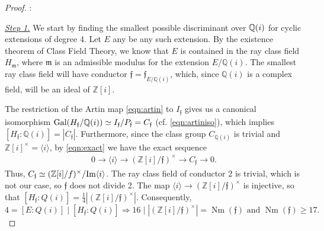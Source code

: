 \documentclass[smallextended]{svjour3}
\newcommand{\Q}{\mathbb{Q}}
\newcommand{\Z}{\mathbb{Z}}
\newcommand{\G}{{\rm Gal}}
\DeclareMathOperator{\Nm}{Nm}
\begin{document}
\begin{proof}:

\noindent\emph{\underline{Step 1.}}   
We start by finding the smallest possible discriminant over $\Q(i)\\
$ for cyclic extensions of degree 4. Let $E$ any be any such extension. By the existence theorem of Class Field Theory, we know that $E$ is contained in the ray class field $ H_{\mathfrak m}$, where $\mathfrak m$ is an admissible modulus for the extension $E/\Q(i)$. The smallest ray class field will have conductor $\mathfrak f = \mathfrak f_{E/\Q(i)}$, which, since $\Q(i)$ is a complex field, will be an ideal of $\Z[i]$. 

The restriction of the Artin map \eqref{eqn:artin} to $I_{\mathfrak f}$ gives us a canonical isomorphism $\G(H_{\mathfrak f}/\Q(i)) \simeq I_{\mathfrak f}/P_{\mathfrak f} = C_{\mathfrak f}$ (cf. \eqref{eqn:artiniso}), which implies $[H_{\mathfrak f}:\Q(i)] = |C_{\mathfrak f}|$. Furthermore, since the class group $C_{\Q(i)}$ is trivial and $\Z[i]^{\times}=\langle i \rangle$, by \eqref{eqn:exact} we have the exact sequence
\begin{align*}
0\to \langle i \rangle \to (\Z[i]/{\mathfrak f})^{\times} \to  C_{\mathfrak f} \to 0.
\end{align*}
Thus, $C_{\mathfrak f} \simeq (\Z[i]/f)^{\times}/ \hbox{Im} \langle i \rangle$.
The ray class field of conductor 2 is trivial, which is not our case, so  $\mathfrak f$ does not divide 2. The map $\langle i \rangle \to(\Z[i]/\mathfrak f)^{\times} $ is injective, so that $[H_{\mathfrak f}:Q(i)] =  \frac{1}{4}\left|(\Z[i]/\mathfrak f)^{\times}\right|$. Consequently, $$4 = [E:Q(i)] \mid [H_{\mathfrak f}:Q(i)] \Rightarrow 16 \mid \left | (\Z[i]/\mathfrak  f)^{\times}\right | = \Nm(\mathfrak f) \text{ and }  \Nm(\mathfrak f)\ge17 .$$


\end{proof}
\end{document}
